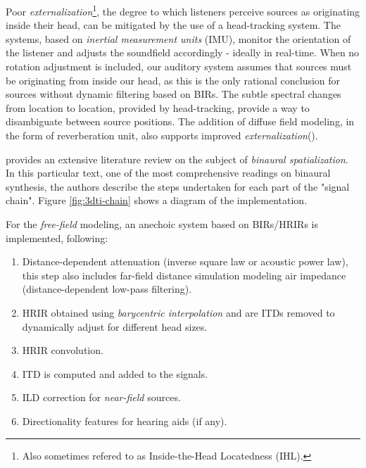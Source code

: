 Poor \textit{externalization}\footnote{Also sometimes refered to as Inside-the-Head Locatedness (IHL).}, the degree to which listeners perceive sources as originating inside their head, can be mitigated by the use of a head-tracking system. The systems, based on \textit{inertial measurement units} (IMU), monitor the orientation of the listener and adjusts the soundfield accordingly - ideally in real-time. When no rotation adjustment is included, our auditory system assumes that sources must be originating from inside our head, as this is the only rational conclusion for sources without dynamic filtering based on BIRs. The subtle spectral changes from location to location, provided by head-tracking, provide a way to disambiguate between source positions. The addition of diffuse field modeling, in the form of reverberation unit, also supports improved \textit{externalization}(\cite{sakamoto1976out}). 



\cite{cuevas20193d} provides an extensive literature review on the subject of \textit{binaural spatialization}. In this particular text, one of the most comprehensive readings on binaural synthesis, the authors describe the steps undertaken for each part of the "signal chain". Figure \ref{fig:3dti-chain} shows a diagram of the implementation. 

For the \textit{free-field} modeling, an anechoic system based on BIRs/HRIRs is implemented, following:

\begin{enumerate}
    \item Distance-dependent attenuation (inverse square law or acoustic power law), this step also includes far-field distance simulation modeling air impedance (distance-dependent low-pass filtering).
    \item HRIR obtained using \textit{barycentric interpolation} and are ITDs removed to dynamically adjust for different head sizes.
    \item HRIR convolution.
    \item ITD is computed and added to the signals.
    \item ILD correction for \textit{near-field} sources.
    \item Directionality features for hearing aids (if any).
\end{enumerate}

